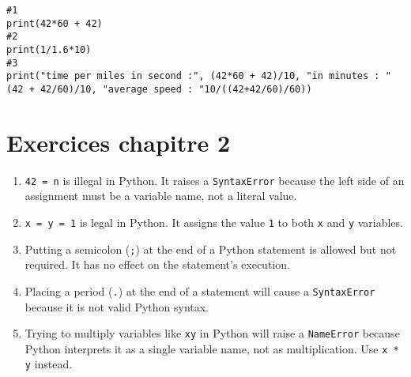 \sol \begin{verbatim}
#1 
print(42*60 + 42)
#2 
print(1/1.6*10)
#3
print("time per miles in second :", (42*60 + 42)/10, "in minutes : " (42 + 42/60)/10, "average speed : "10/((42+42/60)/60))
\end{verbatim}

\section*{Exercices chapitre 2}

\sol 
\begin{enumerate}
    \item \texttt{42 = n} is illegal in Python. It raises a \texttt{SyntaxError} because the left side of an assignment must be a variable name, not a literal value.
    \item \texttt{x = y = 1} is legal in Python. It assigns the value \texttt{1} to both \texttt{x} and \texttt{y} variables.
    \item Putting a semicolon (\texttt{;}) at the end of a Python statement is allowed but not required. It has no effect on the statement's execution.
    \item Placing a period (\texttt{.}) at the end of a statement will cause a \texttt{SyntaxError} because it is not valid Python syntax.
    \item Trying to multiply variables like \texttt{xy} in Python will raise a \texttt{NameError} because Python interprets it as a single variable name, not as multiplication. Use \texttt{x * y} instead.
\end{enumerate}

